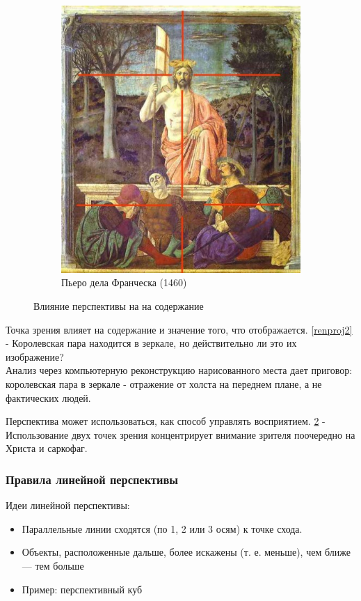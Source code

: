 \documentclass[a4paper, 14pt]{extarticle}
\begin{document}
\begin{figure}[h]
\begin{subfigure}[b]{0.45\textwidth}
		\includegraphics[width=\textwidth]{l5/S012.jpg}
		\caption{Пьеро дела Франческа (1460)}
		\label{renproj3}
	\end{subfigure}
	\caption{Влияние перспективы на на содержание}
\end{figure}
Точка зрения влияет на содержание и значение того, что отображается. \ref{renproj2} - Королевская пара находится в зеркале, но действительно ли это их изображение?\\
Анализ через компьютерную реконструкцию нарисованного места дает приговор: королевская пара в зеркале - отражение от холста на переднем плане, а не фактических людей.

Перспектива может использоваться, как способ управлять восприятием. \ref{renproj3} - Использование двух точек зрения концентрирует внимание зрителя поочередно на Христа и саркофаг.

\subsubsection{Правила линейной перспективы}
Идеи линейной перспективы:
\begin{itemize}
	\item Параллельные линии сходятся (по 1, 2 или 3 осям) к точке схода.
	\item Объекты, расположенные дальше, более искажены (т. е. меньше), чем ближе — тем больше
	\item Пример: перспективный куб
\end{itemize}
\FloatBarrier
\end{document}
